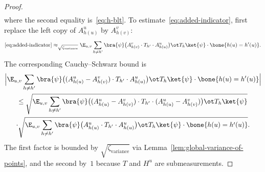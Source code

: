 \begin{proof}
\begin{align}
  \end{align}
  where the second equality is~\eqref{eq:h-blt}. To estimate~\eqref{eq:added-indicator}, first replace the left copy of $A^u_{h(u)}$ by $A^v_{h(v)}$:
  \begin{equation}\label{eq:swapped-u-for-v}
    \eqref{eq:added-indicator}
    \approx_{\sqrt{\zeta_{\mathrm{variance}}}}
    \E_{u,v} \sum_{h \neq h'} \bra{\psi} \bigl(A^{v}_{h(v)} \cdot T_{h'} \cdot A^{u}_{h(u)}\bigr) \ot T_h \ket{\psi} \cdot \bone{h(u) = h'(u)}.
  \end{equation}
  The corresponding Cauchy--Schwarz bound is
  \begin{multline}
    \Big|\E_{u,v} \sum_{h \neq h'} \bra{\psi} \bigl((A^{u}_{h(u)} - A^{v}_{h(v)}) \cdot T_{h'} \cdot A^{u}_{h(u)}\bigr) \ot T_h \ket{\psi} \cdot \bone{h(u) = h'(u)}\Big|\\
    \leq
    \sqrt{\E_{u,v} \sum_{h \neq h'} \bra{\psi} \bigl((A^{u}_{h(u)} - A^{v}_{h(v)}) \cdot T_{h'} \cdot (A^{u}_{h(u)} - A^{v}_{h(v)})\bigr) \ot T_h\ket{\psi}}\\
    \cdot \sqrt{\E_{u,v} \sum_{h \neq h'} \bra{\psi} \bigl(A^{u}_{h(u)} \cdot T_{h'} \cdot A^{u}_{h(u)}\bigr) \ot T_h\ket{\psi} \cdot \bone{h(u) = h'(u)}}. \label{eq:swapped-u-for-cauchy-schwarz}
  \end{multline}
  The first factor is bounded by $\sqrt{\zeta_{\mathrm{variance}}}$ via Lemma~\ref{lem:global-variance-of-points}, and the second by~$1$ because $T$ and $H^u$ are submeasurements.


\end{proof}
